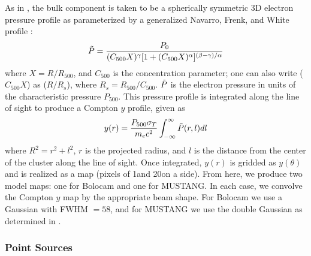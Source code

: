\documentclass[iop,numberedappendix,apj]{emulateapj}
\begin{document}
 As in \citet{romero2015a}, the bulk component is taken to be a 
spherically symmetric 3D electron pressure profile as parameterized by a generalized Navarro, Frenk,
and White profile \citep[hereafter, gNFW][]{navarro1997,nagai2007}:
\begin{equation}
  \Tilde{P} = \frac{P_0}{(C_{500} X)^{\gamma} [1 + (C_{500} X)^{\alpha}]^{(\beta - \gamma)/\alpha}}
\end{equation}
where $X = R / R_{500}$, and $C_{500}$ is the concentration parameter; one can also write ($C_{500} X$) as
($R / R_s$), where $R_s = R_{500}/C_{500}$. $\Tilde{P}$ is the electron pressure in units of the characteristic
pressure $P_{500}$. This pressure profile is integrated along the line of sight to produce 
a Compton $y$ profile, given as 
\begin{equation}
  y(r) = \frac{P_{500} \sigma_{T}}{m_e c^2} \int_{-\infty}^{\infty} \Tilde{P}(r,l) dl
\end{equation}
where $R^2 = r^2 + l^2$, $r$ is the projected radius, and $l$ is the distance from the center of the cluster
along the line of sight. Once integrated, $y(r)$ is gridded as $y(\theta)$ and  is realized as a map 
(pixels of 1\asecs and 20\asecs on a side). From here, we produce two model maps: one for Bolocam and one for MUSTANG. 
In each case, we convolve the Compton $y$ map by the appropriate beam shape. For Bolocam we use a Gaussian with FWHM
$= 58$\asec, and for MUSTANG we use the double Gaussian as determined in \citet{romero2015a}.

\subsubsection{Point Sources}
\label{sec:ptsrcs}
\end{document}
